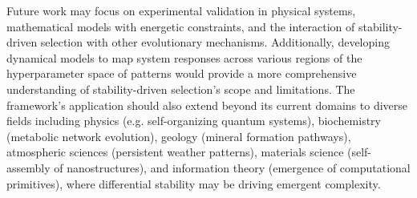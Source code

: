 \documentclass[preprint,12pt]{elsarticle}
\begin{document}
Future work may focus on experimental validation in physical systems, mathematical models with energetic constraints, and the interaction of stability-driven selection with other evolutionary mechanisms. Additionally, developing dynamical models to map system responses across various regions of the hyperparameter space of patterns would provide a more comprehensive understanding of stability-driven selection's scope and limitations. The framework's application should also extend beyond its current domains to diverse fields including physics (e.g. self-organizing quantum systems), biochemistry (metabolic network evolution), geology (mineral formation pathways), atmospheric sciences (persistent weather patterns), materials science (self-assembly of nanostructures), and information theory (emergence of computational primitives), where differential stability may be driving emergent complexity.


\vspace{6pt} 



\end{document}
